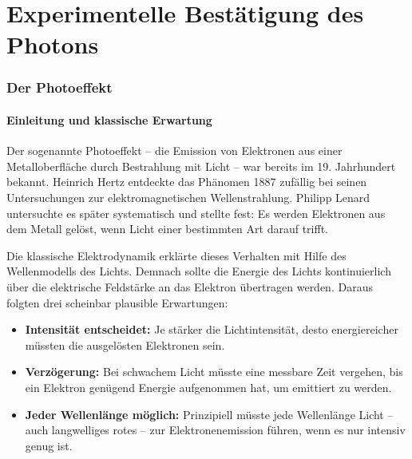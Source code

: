 \chapter{Experimentelle Bestätigung des Photons}
\setcounter{section}{4}
\setcounter{subsection}{0}
\setcounter{subsubsection}{1}
\setcounter{secnumdepth}{3}
\setlength{\parindent}{0pt}
\subsection{Der Photoeffekt }

\subsubsection{ Einleitung und klassische Erwartung}

Der sogenannte Photoeffekt – die Emission von Elektronen aus einer Metalloberfläche durch Bestrahlung mit Licht – war bereits im 19. Jahrhundert bekannt. Heinrich Hertz entdeckte das Phänomen 1887 zufällig bei seinen Untersuchungen zur elektromagnetischen Wellenstrahlung. Philipp Lenard untersuchte es später systematisch und stellte fest: Es werden Elektronen aus dem Metall gelöst, wenn Licht einer bestimmten Art darauf trifft.

Die klassische Elektrodynamik erklärte dieses Verhalten mit Hilfe des Wellenmodells des Lichts. Demnach sollte die Energie des Lichts kontinuierlich über die elektrische Feldstärke an das Elektron übertragen werden. Daraus folgten drei scheinbar plausible Erwartungen:

\begin{itemize}
	\item \textbf{Intensität entscheidet:} Je stärker die Lichtintensität, desto energiereicher müssten die ausgelösten Elektronen sein.
	\item \textbf{Verzögerung:} Bei schwachem Licht müsste eine messbare Zeit vergehen, bis ein Elektron genügend Energie aufgenommen hat, um emittiert zu werden.
	\item \textbf{Jeder Wellenlänge möglich:} Prinzipiell müsste jede Wellenlänge Licht – auch langwelliges rotes – zur Elektronenemission führen, wenn es nur intensiv genug ist.
\end{itemize}

